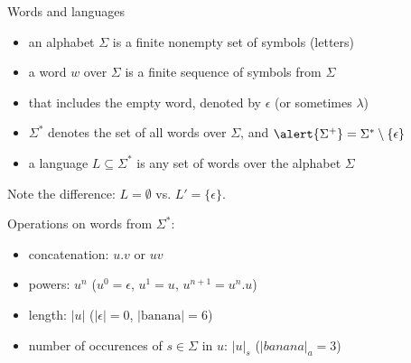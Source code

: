 \documentclass[handout]{beamer}
\begin{document}
\begin{frame}{Words and languages}

    \begin{itemize}
        \item an \alert{alphabet} $\Sigma$ is a finite nonempty set of symbols (letters)
        \item a \alert{word} $w$ over $\Sigma$ is a finite sequence of symbols from $\Sigma$
        \item that includes the \alert{empty word}, denoted by \alert{$\epsilon$} (or sometimes $\lambda$)
        \item \alert{$\Sigma^*$} denotes the set of all words over $\Sigma$, and $\alert{\Sigma^+}=\Sigma^*\setminus \{\epsilon\}$
        \item a \alert{language} $L\subseteq \Sigma^*$ is any set of words over the alphabet $\Sigma$
    \end{itemize}
          
    Note the difference: $L=\emptyset$ vs. $L'=\{\epsilon\}$.

    Operations on words from $\Sigma^*$:
    \begin{itemize}
        \item \alert{concatenation:} $u.v$ or $uv$
        \item \alert{powers:} $u^n$ ($u^0=\epsilon$, $u^1=u$, $u^{n+1}=u^n.u$)
        \item \alert{length:} $|u|$ ($|\epsilon|=0$, $|\text{banana}|=6$)
        \item \alert{number of occurences} of $s\in \Sigma$ in $u$: $|u|_s$ ($|banana|_a=3$)
    \end{itemize}

\end{frame}
   
\end{document}
